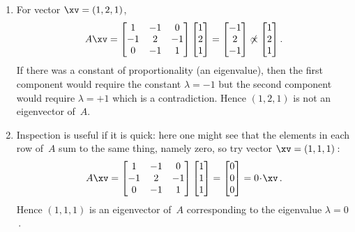 \begin{example}
\begin{solution}
\begin{enumerate}
\item For vector \(\xv=(1,2,1)\),
\begin{equation*}
A\xv=\begin{bmatrix} 1&-1&0\\-1&2&-1\\0&-1&1 \end{bmatrix}
\begin{bmatrix} 1\\2\\1 \end{bmatrix}
=\begin{bmatrix} -1\\2\\-1  \end{bmatrix}
\not\propto\begin{bmatrix} 1\\2\\1 \end{bmatrix}.
\end{equation*}
If there was a constant of proportionality (an eigenvalue), then the first component would require the constant \(\lambda=-1\) but the second component would require \(\lambda=+1\) which is a contradiction.
Hence \((1,2,1)\) is not an eigenvector of~\(A\).

\item Inspection is useful if it is quick: here one might see that the elements in each row of~\(A\) sum to the same thing, namely zero, so  try vector \(\xv=(1,1,1)\)\,:
\begin{equation*}
A\xv=\begin{bmatrix} 1&-1&0\\-1&2&-1\\0&-1&1 \end{bmatrix}
\begin{bmatrix} 1\\1\\1 \end{bmatrix}
=\begin{bmatrix} 0\\0\\0  \end{bmatrix}
=0\cdot\xv\,.
\end{equation*}
Hence \((1,1,1)\) is an eigenvector of~\(A\) corresponding to the eigenvalue \(\lambda=0\)\,.

\end{enumerate}
\end{solution}
\end{example}



